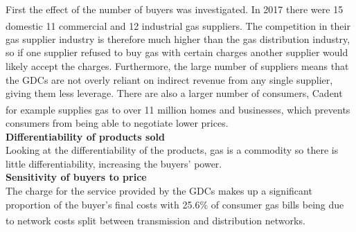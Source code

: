 \documentclass[11pt]{article}		%
\newcommand{\supercite}[1]{\textsuperscript{\cite{#1}}}		%
\begin{document}
		        
                First the effect of the number of buyers was investigated. In 2017 there were 15 domestic  11 commercial and 12 industrial  gas suppliers.\supercite{competition_in_gas_supply} The competition in their gas supplier industry is therefore much higher than the gas distribution industry, so if one supplier refused to buy gas with certain charges another supplier would likely accept the charges. Furthermore, the large number of suppliers means that the GDCs are not overly reliant on indirect revenue from any single supplier, giving them less leverage. There are also a larger number of consumers, Cadent for example supplies gas to over 11 million homes and businesses\supercite{Cadent_Plan}, which prevents consumers from being able to negotiate lower prices.
                \\
                \textbf{Differentiability of products sold}
                \\
                Looking at the differentiability of the products, gas is a commodity so there is little differentiability, increasing the buyers' power.
                \\
              \textbf{  Sensitivity of buyers to price}
              \\
                The charge for the service provided by the GDCs makes up a significant proportion of the buyer’s final costs with 25.6\% of consumer gas bills being due to network costs split between transmission and distribution networks. \supercite{gas_cost} %
\end{document}

